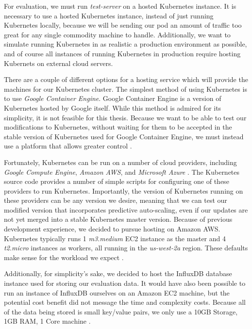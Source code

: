 For evaluation, we must run \textit{test-server} on a hosted Kubernetes
instance. It is necessary to use a hosted Kubernetes instance, instead of just
running Kubernetes locally, because we will be sending our pod an amount of
traffic too great for any single commodity machine to handle. Additionally, we
want to simulate running Kubernetes in as realistic a production environment as
possible, and of course all instances of running Kubernetes in production
require hosting Kubernets on external cloud servers.

There are a couple of different options for a hosting service which will provide
the machines for our Kubernetes cluster. The simplest method
of using Kubernetes is to use \textit{Google Container
Engine}. Google Container Engine is a version of Kubernetes hosted by Google
itself. While this method is admired for its simplicity, it is not
feasible for this thesis. Because we want to be able to test our modifications
to Kubernetes, without waiting for them to be accepted in the stable version of
Kubernetes used for Google Container Engine, we must instead use a platform that
allows greater control \cite{getting-started-k8s}.

Fortunately, Kubernetes can be run on a number of cloud providers, including
\textit{Google Compute Engine}, \textit{Amazon AWS}, and \textit{Microsoft
Azure} \cite{getting-started-k8s}.
The Kubernetes source code provides a number of simple scripts for
configuring one of these providers to run Kubernetes. Importantly, the version
of Kubernetes running on these providers can be any version we desire, meaning
that we can test our modified version that incorporates predictive auto-scaling,
even if our updates are not yet merged into a stable Kubernetes master version.
Because of previous development experience, we decided to
pursue hosting on Amazon AWS. Kubernetes typically runs 1 \textit{m3.medium}
EC2 instance as the master and 4 \textit{t2.micro} instances as workers, all
running in the \textit{us-west-2a} region. These defaults make
sense for the workload we expect \cite{getting-started-k8s-aws}.

Additionally, for simplicity's sake, we decided to host the InfluxDB database
instance used for storing our evaluation data. It would have also been possible
to run an instance of InfluxDB ourselves on an Amazon EC2 machine, but the
potential cost benefit did not message the time and complexity costs. Because
all of the data being stored is small key/value pairs, we only use a 10GB
Storage, 1GB RAM, 1 Core machine \cite{influxdb-pricing}.
